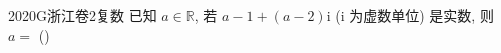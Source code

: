 
\begin{problem}{2020}{G}{浙江卷}{2}{复数}
已知 $ a\in\mathbb{R} $, 若 $ a-1+(a-2)\mathrm{i} $ (i 为虚数单位) 是实数, 则 $ a= $ (\hspace{1cm})

\begin{choices}
\end{choices}
\end{problem}

\begin{answer}

\end{answer}

\begin{solutions}

\end{solutions}